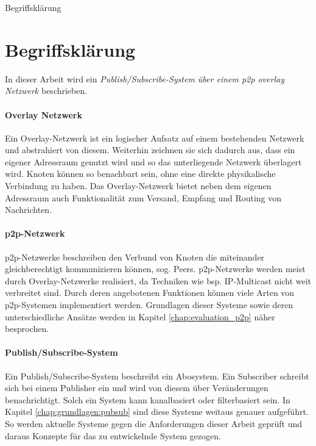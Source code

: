 Begriffsklärung


\section{Begriffsklärung}
In dieser Arbeit wird ein \emph{Publish/Subscribe-System über einem \ac{p2p} overlay Netzwerk} beschrieben.

\paragraph{Overlay Netzwerk} Ein Overlay-Netzwerk ist ein logischer Aufsatz auf einem bestehenden Netzwerk und abstrahiert von diesem. Weiterhin zeichnen sie sich dadurch aus, dass ein eigener Adressraum genutzt wird und so das unterliegende Netzwerk überlagert wird. Knoten können so benachbart sein, ohne eine direkte physikalische Verbindung zu haben. Das Overlay-Netzwerk bietet neben dem eigenen Adressraum auch Funktionalität zum Versand, Empfang und Routing von Nachrichten.


\paragraph{\ac{p2p}-Netzwerk} p2p-Netzwerke beschreiben den Verbund von Knoten die miteinander gleichberechtigt kommunizieren können, sog. Peers. p2p-Netzwerke werden meist durch Overlay-Netzwerke realisiert, da Techniken wie bsp. IP-Multicast nicht weit verbreitet sind. Durch deren angebotenen Funktionen können viele Arten von p2p-Systemen implementiert werden. Grundlagen dieser Systeme sowie deren unterschiedliche Ansätze werden in Kapitel \ref{chap:evaluation_p2p} näher besprochen.


\paragraph{Publish/Subscribe-System} Ein Publish/Subscribe-System beschreibt ein Abosystem. Ein Subscriber schreibt sich bei einem Publisher ein und wird von diesem über Veränderungen benachrichtigt. Solch ein System kann kanalbasiert oder filterbasiert sein. In Kapitel \ref{chap:grundlagen:pubsub} sind diese Systeme weitaus genauer aufgeführt. So werden aktuelle Systeme gegen die Anforderungen dieser Arbeit geprüft und daraus Konzepte für das zu entwickelnde System gezogen.


